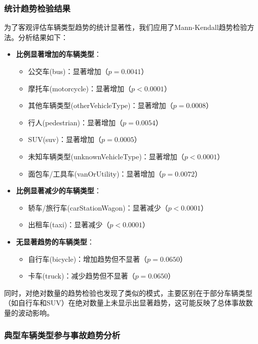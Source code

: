 \documentclass[12pt,a4paper]{article}
\begin{document}
\subsubsection{统计趋势检验结果}

为了客观评估车辆类型趋势的统计显著性，我们应用了Mann-Kendall趋势检验方法。分析结果如下：

\begin{itemize}
\item \textbf{比例显著增加的车辆类型}：
  \begin{itemize}
  \item 公交车(bus)：显著增加（$p = 0.0041$）
  \item 摩托车(motorcycle)：显著增加（$p < 0.0001$）
  \item 其他车辆类型(otherVehicleType)：显著增加（$p = 0.0008$）
  \item 行人(pedestrian)：显著增加（$p = 0.0054$）
  \item SUV(suv)：显著增加（$p = 0.0005$）
  \item 未知车辆类型(unknownVehicleType)：显著增加（$p < 0.0001$）
  \item 面包车/工具车(vanOrUtility)：显著增加（$p = 0.0072$）
  \end{itemize}

\item \textbf{比例显著减少的车辆类型}：
  \begin{itemize}
  \item 轿车/旅行车(carStationWagon)：显著减少（$p < 0.0001$）
  \item 出租车(taxi)：显著减少（$p < 0.0001$）
  \end{itemize}

\item \textbf{无显著趋势的车辆类型}：
  \begin{itemize}
  \item 自行车(bicycle)：增加趋势但不显著（$p = 0.0650$）
  \item 卡车(truck)：减少趋势但不显著（$p = 0.0650$）
  \end{itemize}
\end{itemize}

同时，对绝对数量的趋势检验也发现了类似的模式，主要区别在于部分车辆类型（如自行车和SUV）在绝对数量上未显示出显著趋势，这可能反映了总体事故数量的波动影响。

\subsubsection{典型车辆类型参与事故趋势分析}
\end{document}
